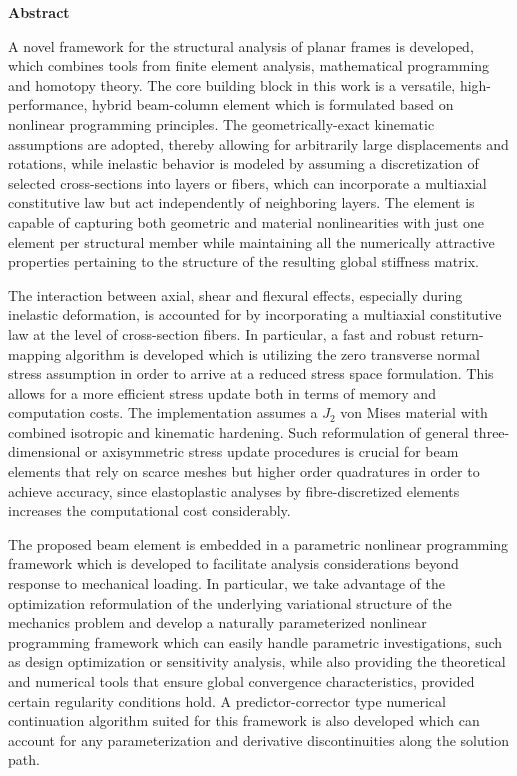 \clearpage
\begin{center}
	\textbf{\Large Abstract}\\
	\vspace{\baselineskip}
\end{center}

A novel framework for the structural analysis of planar frames is developed, 
which 
combines tools from finite element analysis, mathematical programming and homotopy 
theory. The core building block in this work is a versatile, high-performance, hybrid 
beam-column element which is formulated based on nonlinear programming 
principles. The 
geometrically-exact kinematic assumptions are adopted, thereby allowing for 
arbitrarily large displacements and rotations, while inelastic behavior is modeled by
assuming a discretization of selected cross-sections into layers or fibers, which can 
incorporate a multiaxial constitutive law but act independently of neighboring layers. 
The element is capable of capturing both geometric and material nonlinearities with 
just one element per structural member while maintaining all the numerically 
attractive properties pertaining to the structure of the resulting global stiffness 
matrix.

The interaction between axial, shear and flexural effects, especially during inelastic 
deformation, is accounted for by incorporating a multiaxial constitutive law at the 
level of cross-section fibers. In particular, a fast and robust return-mapping 
algorithm is developed which is utilizing the zero transverse normal stress assumption 
in order to arrive at a reduced stress space formulation. This allows for a more 
efficient stress update both in terms of memory and computation costs. The 
implementation assumes a $J_2$ von Mises material with combined isotropic and 
kinematic hardening. Such reformulation of general three-dimensional or axisymmetric 
stress update procedures is crucial for beam elements that rely on scarce meshes but 
higher order quadratures in order to achieve accuracy, since elastoplastic analyses by 
fibre-discretized elements increases the computational cost considerably.

The proposed beam element is embedded in a parametric nonlinear programming framework 
which is developed to facilitate analysis considerations beyond response to mechanical 
loading. In particular, we take advantage of the optimization reformulation of the 
underlying variational structure of the mechanics problem and develop a naturally 
parameterized nonlinear programming framework which can easily handle parametric 
investigations, such as design optimization or sensitivity analysis, while also 
providing the theoretical and numerical tools that ensure global convergence 
characteristics, provided certain regularity conditions hold. A predictor-corrector 
type numerical continuation algorithm suited for this framework is also developed 
which can account for any parameterization and derivative discontinuities along the 
solution path.  

